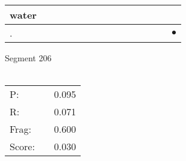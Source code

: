 \documentclass[landscape]{article}
\newcommand{\ssp}{\hspace{2pt}}
\newcommand{\mex}{\cellcolor{g}$\bullet$}
\begin{document}
\begin{tabular}{|l|p{10pt}|p{10pt}|p{10pt}|p{10pt}|p{10pt}|p{10pt}|p{10pt}|p{10pt}|p{10pt}|p{10pt}|p{10pt}|p{10pt}|p{10pt}|p{10pt}|}
\hline
\ssp water \ssp&\hspace{2pt}&\hspace{2pt}&\hspace{2pt}&\hspace{2pt}&\hspace{2pt}&\hspace{2pt}&\hspace{2pt}&\hspace{2pt}&\hspace{2pt}&\hspace{2pt}&\hspace{2pt}&\hspace{2pt}&\hspace{2pt}&\hspace{2pt}\\
\hline
\ssp \cellcolor{ref13}. \ssp&\hspace{2pt}&\hspace{2pt}&\hspace{2pt}&\hspace{2pt}&\hspace{2pt}&\hspace{2pt}&\hspace{2pt}&\hspace{2pt}&\hspace{2pt}&\hspace{2pt}&\hspace{2pt}&\hspace{2pt}&\hspace{2pt}&\hspace{2pt}\mex\\
\hline
\end{tabular}

\vspace{6pt}
\noindent Segment 206\\\\
\noindent\begin{tabular}{lm{12pt}r}
\hline
P:&&0.095\\
R:&&0.071\\
Frag:&&0.600\\
Score:&&0.030\\
\end{tabular}

\newpage
\end{document}
